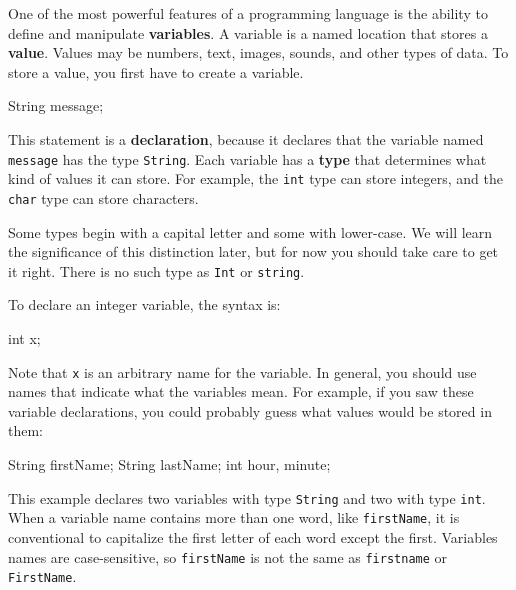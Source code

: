 \documentclass[12pt]{book}
\theoremstyle{exercise}
\newcommand{\java}[1]{\verb"#1"}
\begin{document}
One of the most powerful features of a programming language is the ability to define and manipulate {\bf variables}.
A variable is a named location that stores a {\bf value}.
Values may be numbers, text, images, sounds, and other types of data.
To store a value, you first have to create a variable.

\begin{code}
    String message;
\end{code}


This statement is a {\bf declaration}, because it declares that the variable named \java{message} has the type \java{String}.
Each variable has a {\bf type} that determines what kind of values it can store.
For example, the \java{int} type can store integers, and the \java{char} type can store characters.

Some types begin with a capital letter and some with lower-case.
We will learn the significance of this distinction later, but for now you should take care to get it right.
There is no such type as \java{Int} or \java{string}.

To declare an integer variable, the syntax is:

\begin{code}
    int x;
\end{code}

Note that \java{x} is an arbitrary name for the variable.
In general, you should use names that indicate what the variables mean.
For example, if you saw these variable declarations, you could probably guess what values would be stored in them:

\begin{code}
    String firstName;
    String lastName;
    int hour, minute;
\end{code}

This example declares two variables with type \java{String} and two with type \java{int}.
When a variable name contains more than one word, like \java{firstName}, it is conventional to capitalize the first letter of each word except the first.
Variables names are case-sensitive, so \java{firstName} is not the same as \java{firstname} or \java{FirstName}.
\end{document}

